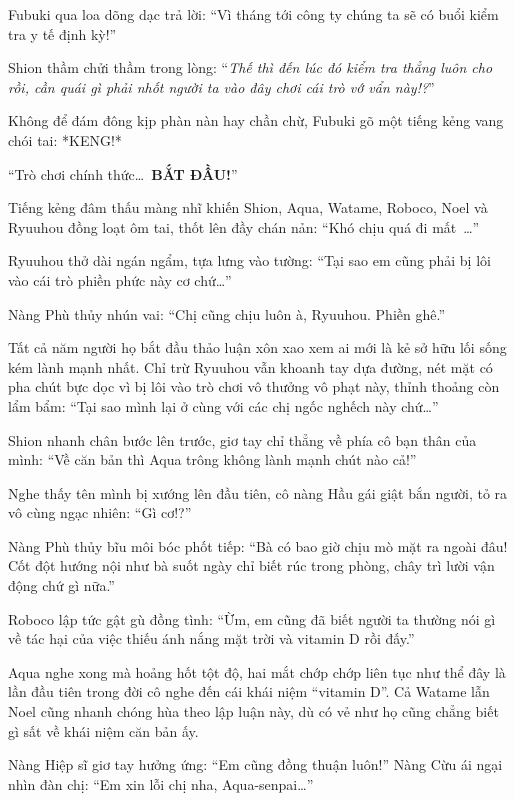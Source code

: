 \documentclass[../main.tex]{subfiles}
\begin{document}
Fubuki qua loa dõng dạc trả lời: ``Vì tháng tới công ty chúng ta sẽ có buổi kiểm tra y tế định kỳ!''

Shion thầm chửi thầm trong lòng: ``\textit{Thế thì đến lúc đó kiểm tra thẳng luôn cho rồi, cần quái gì phải nhốt người ta vào đây chơi cái trò vớ vẩn này!?}''

Không để đám đông kịp phàn nàn hay chần chừ, Fubuki gõ một tiếng kẻng vang chói tai: *KENG!*

``Trò chơi chính thức\dots\ \textbf{BẮT ĐẦU!}''

Tiếng kẻng đâm thấu màng nhĩ khiến Shion, Aqua, Watame, Roboco, Noel và Ryuuhou đồng loạt ôm tai, thốt lên đầy chán nản: ``Khó chịu quá đi mất~\dots''

Ryuuhou thở dài ngán ngẩm, tựa lưng vào tường: ``Tại sao em cũng phải bị lôi vào cái trò phiền phức này cơ chứ\dots''

Nàng Phù thủy nhún vai: ``Chị cũng chịu luôn à, Ryuuhou. Phiền ghê.''

\ct

Tất cả năm người họ bắt đầu thảo luận xôn xao xem ai mới là kẻ sở hữu lối sống kém lành mạnh nhất. Chỉ trừ Ryuuhou vẫn khoanh tay dựa đường, nét mặt có pha chút bực dọc vì bị lôi vào trò chơi vô thưởng vô phạt này, thỉnh thoảng còn lẩm bẩm: ``Tại sao mình lại ở cùng với các chị ngốc nghếch này chứ\dots''

Shion nhanh chân bước lên trước, giơ tay chỉ thẳng về phía cô bạn thân của mình: ``Về căn bản thì Aqua trông không lành mạnh chút nào cả!''

Nghe thấy tên mình bị xướng lên đầu tiên, cô nàng Hầu gái giật bắn người, tỏ ra vô cùng ngạc nhiên: ``Gì cơ!?''

Nàng Phù thủy bĩu môi bóc phốt tiếp: ``Bà có bao giờ chịu mò mặt ra ngoài đâu! Cốt đột hướng nội như bà suốt ngày chỉ biết rúc trong phòng, chây trì lười vận động chứ gì nữa.''

Roboco lập tức gật gù đồng tình: ``Ừm, em cũng đã biết người ta thường nói gì về tác hại của việc thiếu ánh nắng mặt trời và vitamin D rồi đấy.''

Aqua nghe xong mà hoảng hốt tột độ, hai mắt chớp chớp liên tục như thể đây là lần đầu tiên trong đời cô nghe đến cái khái niệm ``vitamin D''. Cả Watame lẫn Noel cũng nhanh chóng hùa theo lập luận này, dù có vẻ như họ cũng chẳng biết gì sất về khái niệm căn bản ấy.

Nàng Hiệp sĩ giơ tay hưởng ứng: ``Em cũng đồng thuận luôn!'' Nàng Cừu ái ngại nhìn đàn chị: ``Em xin lỗi chị nha, Aqua-senpai\dots''
\end{document}
